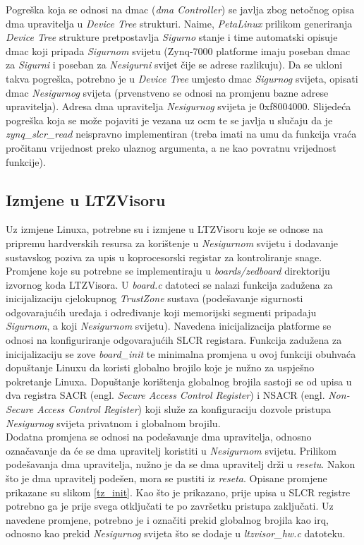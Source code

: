 \documentclass[times, utf8, diplomski, numeric]{fer}
\begin{document}
Pogreška koja se odnosi na \gls{dmac} (\textit{\gls{dma} Controller}) se javlja zbog netočnog opisa \gls{dma} upravitelja u \textit{Device
Tree} strukturi. Naime, \textit{PetaLinux} prilikom generiranja \textit{Device Tree} strukture pretpostavlja \textit{Sigurno} stanje i
time automatski opisuje \gls{dmac} koji pripada \textit{Sigurnom} svijetu (Zynq-7000 platforme imaju poseban \gls{dmac} za \textit{Sigurni} i poseban za
\textit{Nesigurni} svijet čije se adrese razlikuju). Da se ukloni takva pogreška, potrebno je u \textit{Device Tree} umjesto \gls{dmac}
\textit{Sigurnog} svijeta, opisati \gls{dmac} \textit{Nesigurnog} svijeta (prvenstveno se odnosi na promjenu bazne adrese upravitelja).
Adresa \gls{dma} upravitelja \textit{Nesigurnog} svijeta je 0xf8004000.
Slijedeća pogreška koja se može pojaviti je vezana uz \gls{ocm} te se javlja u slučaju da je \textit{zynq\_slcr\_read} neispravno
implementiran (treba imati na umu da funkcija vraća pročitanu vrijednost preko ulaznog argumenta, a ne kao povratnu vrijednost
funkcije).

\subsection{Izmjene u LTZVisoru}
Uz izmjene Linuxa, potrebne su i izmjene u LTZVisoru koje se odnose na pripremu hardverskih resursa za korištenje u \textit{Nesigurnom}
svijetu i dodavanje sustavskog poziva za upis u koprocesorski registar za kontroliranje snage. Promjene koje su potrebne se
implementiraju u \textit{boards/zedboard} direktoriju izvornog koda LTZVisora. U \textit{board.c} datoteci se nalazi funkcija
zadužena za inicijalizaciju cjelokupnog \textit{TrustZone} sustava (podešavanje sigurnosti odgovarajućih uređaja i određivanje
koji memorijski segmenti pripadaju \textit{Sigurnom}, a koji \textit{Nesigurnom} svijetu). Navedena inicijalizacija platforme se odnosi na
konfiguriranje odgovarajućih SLCR registara. Funkcija zadužena za inicijalizaciju se zove \textit{board\_init} te minimalna
promjena u ovoj funkciji obuhvaća dopuštanje Linuxu da koristi globalno brojilo koje je nužno za uspješno pokretanje Linuxa.
Dopuštanje korištenja globalnog brojila sastoji se od upisa u dva registra SACR (engl. \textit{Secure Access Control Register})
i NSACR (engl. \textit{Non-Secure Access Control Register}) koji služe za konfiguraciju dozvole pristupa \textit{Nesigurnog} svijeta
privatnom i globalnom brojilu.\\
Dodatna promjena se odnosi na podešavanje \gls{dma} upravitelja, odnosno označavanje da će se \gls{dma} upravitelj koristiti u \textit{Nesigurnom}
svijetu. Prilikom podešavanja \gls{dma} upravitelja, nužno je da se \gls{dma} upravitelj drži u \textit{resetu}. Nakon što je \gls{dma} upravitelj
podešen, mora se pustiti iz \textit{reseta}. Opisane promjene prikazane su slikom \ref{tz_init}.
Kao što je prikazano, prije upisa u SLCR registre potrebno ga je prije svega otključati te po završetku pristupa zaključati.
Uz navedene promjene, potrebno je i označiti prekid globalnog brojila kao \gls{irq}, odnosno kao prekid \textit{Nesigurnog} svijeta
što se dodaje u \textit{ltzvisor\_hw.c} datoteku.
\end{document}
